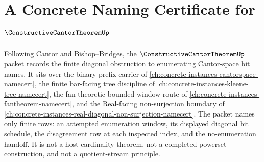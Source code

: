 \chapter{A Concrete Naming Certificate for $\ConstructiveCantorTheoremUp$}
\label{ch:concrete-instances-constructive-cantor-theorem-namecert}

Following Cantor and Bishop--Bridges, the $\ConstructiveCantorTheoremUp$ packet records the finite diagonal obstruction to enumerating Cantor-space bit names. It sits over the binary prefix carrier of \autoref{ch:concrete-instances-cantorspace-namecert}, the finite bar-facing tree discipline of \autoref{ch:concrete-instances-kleene-tree-namecert}, the fan-theoretic bounded-window route of \autoref{ch:concrete-instances-fantheorem-namecert}, and the Real-facing non-surjection boundary of \autoref{ch:concrete-instances-real-diagonal-non-surjection-namecert}. The packet names only finite rows: an attempted enumeration window, its displayed diagonal bit schedule, the disagreement row at each inspected index, and the no-enumeration handoff. It is not a host-cardinality theorem, not a completed powerset construction, and not a quotient-stream principle.

